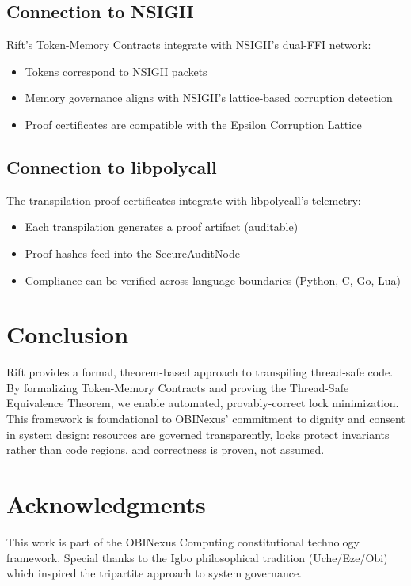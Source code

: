 \documentclass[11pt]{article}
\begin{document}
\subsection{Connection to NSIGII}

Rift's Token-Memory Contracts integrate with NSIGII's dual-FFI network:
\begin{itemize}
    \item Tokens correspond to NSIGII packets
    \item Memory governance aligns with NSIGII's lattice-based corruption detection
    \item Proof certificates are compatible with the Epsilon Corruption Lattice
\end{itemize}

\subsection{Connection to libpolycall}

The transpilation proof certificates integrate with libpolycall's telemetry:
\begin{itemize}
    \item Each transpilation generates a proof artifact (auditable)
    \item Proof hashes feed into the SecureAuditNode
    \item Compliance can be verified across language boundaries (Python, C, Go, Lua)
\end{itemize}

\section{Conclusion}

Rift provides a formal, theorem-based approach to transpiling thread-safe code. By formalizing Token-Memory Contracts and proving the Thread-Safe Equivalence Theorem, we enable automated, provably-correct lock minimization. This framework is foundational to OBINexus' commitment to dignity and consent in system design: resources are governed transparently, locks protect invariants rather than code regions, and correctness is proven, not assumed.

\section*{Acknowledgments}

This work is part of the OBINexus Computing constitutional technology framework. Special thanks to the Igbo philosophical tradition (Uche/Eze/Obi) which inspired the tripartite approach to system governance.
\end{document}
